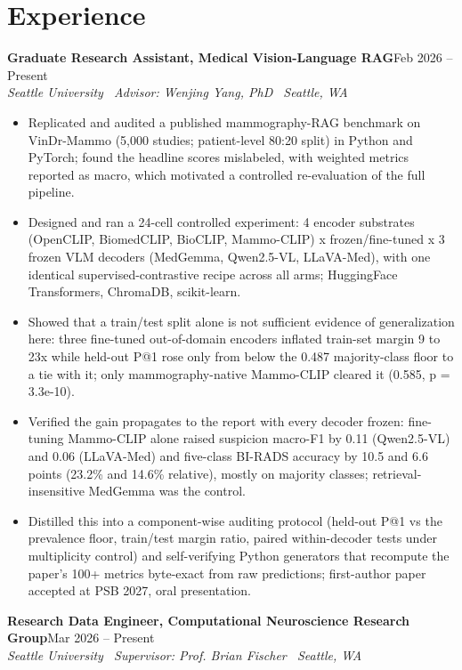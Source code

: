 \documentclass[letterpaper,10pt]{article}
\newcommand{\role}[3]{\vspace{1pt}\textbf{#1}\hfill #2\\[1pt]\textit{#3}\\[1pt]}
\begin{document}
\section{Experience}
\role{Graduate Research Assistant, Medical Vision-Language RAG}{Feb 2026 -- Present}{Seattle University \textbar\  Advisor: Wenjing Yang, PhD \textbar\  Seattle, WA}
\begin{itemize}
  \item Replicated and audited a published mammography-RAG benchmark on VinDr-Mammo (5,000 studies; patient-level 80:20 split) in Python and PyTorch; found the headline scores mislabeled, with weighted metrics reported as macro, which motivated a controlled re-evaluation of the full pipeline.
  \item Designed and ran a 24-cell controlled experiment: 4 encoder substrates (OpenCLIP, BiomedCLIP, BioCLIP, Mammo-CLIP) x frozen/fine-tuned x 3 frozen VLM decoders (MedGemma, Qwen2.5-VL, LLaVA-Med), with one identical supervised-contrastive recipe across all arms; HuggingFace Transformers, ChromaDB, scikit-learn.
  \item Showed that a train/test split alone is not sufficient evidence of generalization here: three fine-tuned out-of-domain encoders inflated train-set margin 9 to 23x while held-out P@1 rose only from below the 0.487 majority-class floor to a tie with it; only mammography-native Mammo-CLIP cleared it (0.585, p = 3.3e-10).
  \item Verified the gain propagates to the report with every decoder frozen: fine-tuning Mammo-CLIP alone raised suspicion macro-F1 by 0.11 (Qwen2.5-VL) and 0.06 (LLaVA-Med) and five-class BI-RADS accuracy by 10.5 and 6.6 points (23.2\% and 14.6\% relative), mostly on majority classes; retrieval-insensitive MedGemma was the control.
  \item Distilled this into a component-wise auditing protocol (held-out P@1 vs the prevalence floor, train/test margin ratio, paired within-decoder tests under multiplicity control) and self-verifying Python generators that recompute the paper's 100+ metrics byte-exact from raw predictions; first-author paper accepted at PSB 2027, oral presentation.
\end{itemize}
\vspace{2pt}
\role{Research Data Engineer, Computational Neuroscience Research Group}{Mar 2026 -- Present}{Seattle University \textbar\  Supervisor: Prof. Brian Fischer \textbar\  Seattle, WA}
\end{document}
